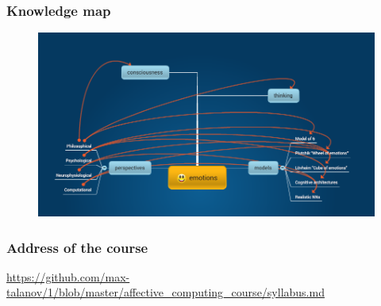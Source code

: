\documentclass[12pt, aspectratio=169]{beamer}
\begin{document}
\begin{frame}
\frametitle{Knowledge map}
\begin{figure}
  \includegraphics[width=0.9\linewidth]{emotions}
\end{figure}
\end{frame}
\begin{frame}
  \frametitle{Address of the course}
  \url{https://github.com/max-talanov/1/blob/master/affective_computing_course/syllabus.md}
\end{frame}
\end{document}
